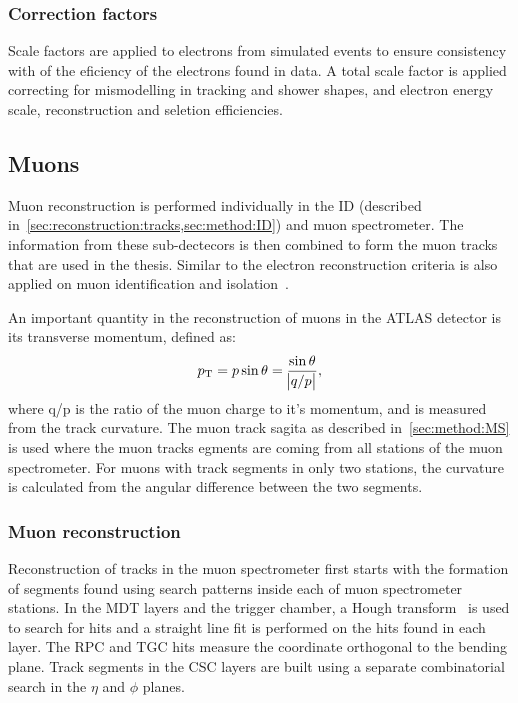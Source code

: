 \subsubsection{Correction factors}

Scale factors are applied to electrons from simulated events to ensure consistency with of the eficiency of the electrons found in data. A total scale factor is applied correcting for mismodelling in tracking and shower shapes, and electron energy scale, reconstruction and seletion efficiencies.

\subsection{Muons}\label{sec:reconstruction:muons}
Muon reconstruction is performed individually in the ID (described in~\cref{sec:reconstruction:tracks,sec:method:ID}) and muon spectrometer. The information from these sub-dectecors is then combined to form the muon tracks that are used in the thesis.  Similar to the electron reconstruction criteria is also applied on muon identification and isolation~\cite{Aad:2016jkr}. 

An important quantity in the reconstruction of muons in the ATLAS detector is its transverse momentum, defined as: 
\begin{equation}
    p_{\text{T}} = p\sin\theta = \frac{\sin\theta}{\abs{q/p}},
\end{equation}
where q/p is the ratio of the muon charge to it's momentum, and is measured from the track curvature. The muon track sagita as described in~\cref{sec:method:MS} is used where the muon tracks egments are coming from all stations of the muon spectrometer. For muons with track segments in only two stations, the curvature is calculated from the angular difference between the two segments. 

\subsubsection{Muon reconstruction}
Reconstruction of tracks in the muon spectrometer first starts with the formation of segments found using search patterns inside each of muon spectrometer stations. In the MDT layers and the trigger chamber, a Hough transform~\cite{HoughTransform} is used to search for hits and a straight line fit is performed on the hits found in each layer. The RPC and TGC hits measure the coordinate orthogonal to the bending plane. Track segments in the CSC layers are built using a separate combinatorial search in the $\eta$ and $\phi$ planes. 

